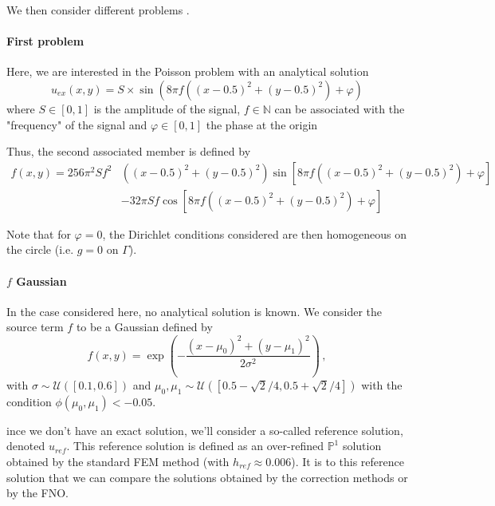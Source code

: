 We then consider different problems .

\paragraph{First problem} \label{Corr.pb.circle.1}

Here, we are interested in the Poisson problem with an analytical solution
\begin{equation*}
	u_{ex}(x,y)=S\times\sin\left(8\pi f\left((x-0.5)^2+(y-0.5)^2\right)+\varphi\right)
\end{equation*}
where $S\in[0,1]$ is the amplitude of the signal, $f\in\mathbb{N}$ can be associated with the "frequency" of the signal and $\varphi\in[0,1]$ the phase at the origin

Thus, the second associated member is defined by
\begin{align*}
	f(x,y)=256\pi^2 S f^2&\left((x-0.5)^2+(y-0.5)^2\right)\sin\left[8\pi f\left((x-0.5)^2+(y-0.5)^2\right) + \varphi\right] \\
	&- 32\pi S f\cos\left[8\pi f \left((x-0.5)^2+(y-0.5)^2\right) + \varphi\right]
\end{align*}

\begin{Rem}
	Note that for $\varphi=0$, the Dirichlet conditions considered are then homogeneous on the circle (i.e. $g=0$ on $\Gamma$).
\end{Rem}


\paragraph{$f$ Gaussian} \label{Corr.pb.circle.2}

In the case considered here, no analytical solution is known. We consider the source term $f$ to be a Gaussian defined by
\begin{equation*}
	f(x,y) = \exp\left(-\frac{(x-\mu_0)^2 + (y-\mu_1)^2}{2\sigma^2}\right)\,,
\end{equation*} 
with $\sigma \sim \mathcal{U}([0.1,0.6])$ and $\mu_0, \mu_1 \sim \mathcal{U}([0.5-\sqrt{2}/4, 0.5+\sqrt{2}/4])$ with the condition $\phi(\mu_0, \mu_1) < -0.05$.

ince we don't have an exact solution, we'll consider a so-called reference solution, denoted $u_{ref}$. This reference solution is defined as an over-refined $\mathbb{P}^1$ solution obtained by the standard FEM method (with $h_{ref}\approx 0.006$). It is to this reference solution that we can compare the solutions obtained by the correction methods or by the FNO.

